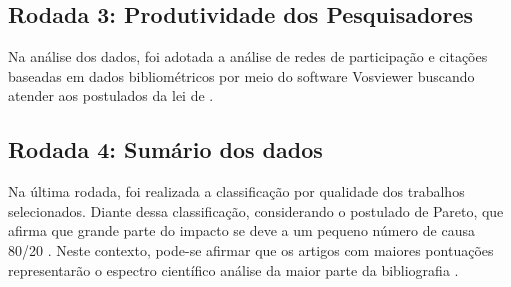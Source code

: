 \begin{table}[H]
  \centering
  \caption{Indicadores adotados para descrição de qualidade dos artigos}
  \label{tab:4}
\end{table}

\subsection{Rodada 3: Produtividade dos Pesquisadores}

Na análise dos dados, foi adotada a análise de redes de participação e citações baseadas em dados bibliométricos por meio do software Vosviewer \cite{Wong2018VOSviewer} buscando atender aos postulados da lei de .

\subsection{Rodada 4: Sumário dos dados}

Na última rodada, foi realizada a classificação por qualidade dos trabalhos selecionados.
Diante dessa classificação, considerando o postulado de Pareto, que afirma que grande parte do impacto se deve a um pequeno número de causa 80/20 \cite{Pareto1964}. Neste contexto, pode-se afirmar que os artigos com maiores pontuações representarão o espectro científico análise da maior parte da bibliografia \cite{Azevedo2014}.

